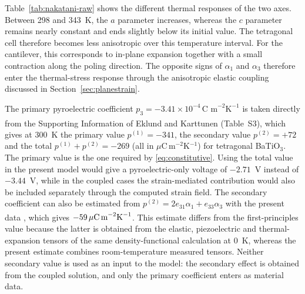\documentclass[a4paper, 11pt, twoside]{article}
\newcommand{\supercite}[1]{\!\!\textsuperscript{\cite{#1}}}
\begin{document}
Table~\ref{tab:nakatani-raw} shows the different thermal responses of the two axes.
Between 298 and 343~K, the $a$ parameter increases, whereas the $c$ parameter remains
nearly constant and ends slightly below its initial value. The tetragonal cell
therefore becomes less anisotropic over this temperature interval. For the cantilever,
this corresponds to in-plane expansion together with a small contraction along the
poling direction. The opposite signs of $\alpha_1$ and $\alpha_3$ therefore enter the
thermal-stress response through the anisotropic elastic coupling discussed in
Section~\ref{sec:planestrain}.

The primary pyroelectric coefficient
$p_3=-3.41\times10^{-4}\,\text{C m}^{-2}\text{K}^{-1}$
is taken directly from the Supporting Information of Eklund and Karttunen
\supercite{EklundKarttunen2023} (Table~S3), which gives at 300~K the primary value
$p^{(1)}=-341$, the secondary value $p^{(2)}=+72$ and the total
$p^{(1)}+p^{(2)}=-269$ (all in $\mu$C\,m$^{-2}$K$^{-1}$) for tetragonal BaTiO$_3$.
The primary value is the one required by \eqref{eq:constitutive}. Using the total value
in the present model would give a pyroelectric-only voltage of $-2.71$~V instead of
$-3.44$~V, while in the coupled cases the strain-mediated contribution would also be
included separately through the computed strain field. The secondary coefficient can
also be estimated from
$p^{(2)}=2e_{31}\alpha_1+e_{33}\alpha_3$
with the present data \supercite{Zgonik1994,Nakatani2016}, which gives
$-59\,\mu\text{C\,m}^{-2}\text{K}^{-1}$. This estimate differs from the
first-principles value because the latter is obtained from the elastic, piezoelectric
and thermal-expansion tensors of the same density-functional calculation at 0~K,
whereas the present estimate combines room-temperature measured tensors. Neither
secondary value is used as an input to the model: the secondary effect is obtained from
the coupled solution, and only the primary coefficient enters as material data.
\end{document}

